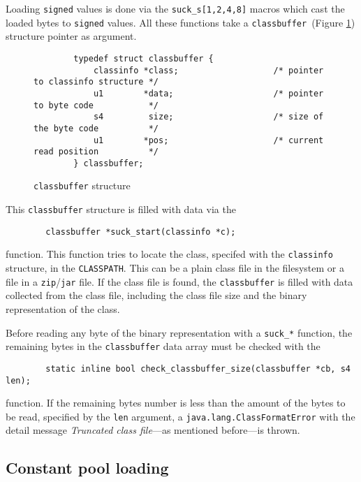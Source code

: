 Loading \texttt{signed} values is done via the
\texttt{suck\_s[1,2,4,8]} macros which cast the loaded bytes to
\texttt{signed} values. All these functions take a
\texttt{classbuffer}~(Figure \ref{classbuffer}) structure pointer as
argument.

\begin{figure}[h]
\begin{verbatim}
        typedef struct classbuffer {
            classinfo *class;                   /* pointer to classinfo structure */
            u1        *data;                    /* pointer to byte code           */
            s4         size;                    /* size of the byte code          */
            u1        *pos;                     /* current read position          */
        } classbuffer;
\end{verbatim}
\caption{\texttt{classbuffer} structure}
\label{classbuffer}
\end{figure}

This \texttt{classbuffer} structure is filled with data via the

\begin{verbatim}
        classbuffer *suck_start(classinfo *c);
\end{verbatim}

function. This function tries to locate the class, specifed with the
\texttt{classinfo} structure, in the \texttt{CLASSPATH}. This can be
a plain class file in the filesystem or a file in a
\texttt{zip}/\texttt{jar} file. If the class file is found, the
\texttt{classbuffer} is filled with data collected from the class
file, including the class file size and the binary representation of
the class.

Before reading any byte of the binary representation with a
\texttt{suck\_*} function, the remaining bytes in the
\texttt{classbuffer} data array must be checked with the

\begin{verbatim}
        static inline bool check_classbuffer_size(classbuffer *cb, s4 len);
\end{verbatim}

function. If the remaining bytes number is less than the amount of the
bytes to be read, specified by the \texttt{len} argument, a
\texttt{java.lang.ClassFormatError} with the detail message
\textit{Truncated class file}---as mentioned before---is thrown.


\subsection{Constant pool loading}

